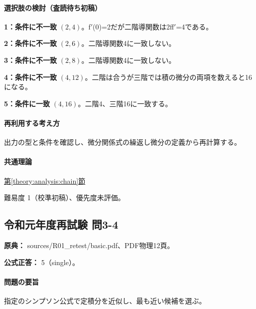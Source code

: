 \paragraph{選択肢の検討（査読待ち初稿）}\mbox{}\par

\noindent\textbf{1：条件に不一致} \((2,4)\)。f\ensuremath{'}(0)=\allowbreak{}2だが二階導関数は2ff\ensuremath{'}=4である。\par

\noindent\textbf{2：条件に不一致} \((2,6)\)。二階導関数4に一致しない。\par

\noindent\textbf{3：条件に不一致} \((2,8)\)。二階導関数4に一致しない。\par

\noindent\textbf{4：条件に不一致} \((4,12)\)。二階は合うが三階では積の微分の両項を数えると16になる。\par

\noindent\textbf{5：条件に一致} \((4,16)\)。二階4、三階16に一致する。\par

\paragraph{再利用する考え方} 出力の型と条件を確認し、微分関係式の繰返し微分の定義から再計算する。

\paragraph{共通理論} \hyperref[theory:analysis:chain]{第\ref*{theory:analysis:chain}節}

\par 難易度 1（校準初稿）、優先度未評価。

\subsection{令和元年度再試験 問3-4}
\label{q:r01-ret-basic-3-4}

\noindent\textbf{原典：} sources/R01\_retest/basic.pdf、PDF物理12頁。

\textbf{公式正答：} 5（single）。

\paragraph{問題の要旨} 指定のシンプソン公式で定積分を近似し、最も近い候補を選ぶ。

